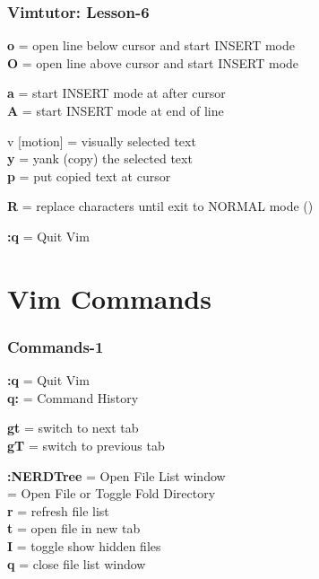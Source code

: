 \documentclass[table,dvipsnames]{beamer}
\begin{document}
	\begin{frame}
		\frametitle{Vimtutor: Lesson-6}
		\begin{exampleblock}{}
			\textbf{o} = open line below cursor and start INSERT mode\\
			\textbf{O} = open line above cursor and start INSERT mode
		\end{exampleblock}
	
		\begin{exampleblock}{}
			\textbf{a} = start INSERT mode at after cursor\\
			\textbf{A} = start INSERT mode at end of line
		\end{exampleblock}
	
		\begin{exampleblock}{}
			\Esc v [motion] = visually selected text\\
			\textbf{y} = yank (copy) the selected text\\
			\textbf{p} = put copied text at cursor
		\end{exampleblock}
	
		\begin{exampleblock}{}
			\textbf{R} = replace characters until exit to NORMAL mode (\Esc)
		\end{exampleblock}
	
		\begin{exampleblock}{}
			\Esc \textbf{:q} = Quit Vim
		\end{exampleblock}
	\end{frame}

	\section{Vim Commands}
	\begin{frame}
		\frametitle{Commands-1}
	
		\begin{exampleblock}{}
			\Esc \textbf{:q} = Quit Vim\\
			\Esc \textbf{q:} = Command History
		\end{exampleblock}
	
		\begin{exampleblock}{}
			\textbf{gt} = switch to next tab\\
			\textbf{gT} = switch to previous tab
		\end{exampleblock}
	
		\begin{exampleblock}{}
			\textbf{:NERDTree} = Open File List window\\
			\keys{\return} = Open File or Toggle Fold Directory\\
			\textbf{r} = refresh file list\\
			\textbf{t} = open file in new tab\\
			\textbf{I} = toggle show hidden files\\
			\textbf{q} = close file list window
		\end{exampleblock}

	\end{frame}
\end{document}

